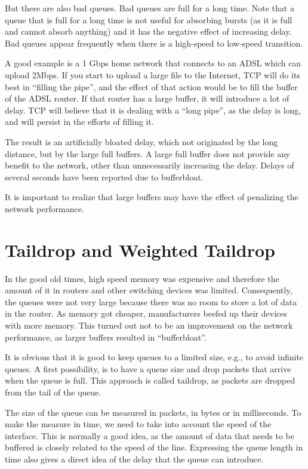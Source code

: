 But there are also bad queues.
Bad queues are full for a long time.
Note that a queue that is full for a long time is not useful for absorbing bursts (as it is full and cannot absorb anything) and it has the negative effect of increasing delay.
Bad queues appear frequently when there is a high-speed to low-speed transition.

A good example is a 1 Gbps home network that connects to an ADSL which can upload 2Mbps.
If you start to upload a large file to the Internet, TCP will do its best in ``filling the pipe'', and the effect of that action would be to fill the buffer of the ADSL router.
If that router has a large buffer, it will introduce a lot of delay.
TCP will believe that it is dealing with a ``long pipe'', as the delay is long, and will persist in the efforts of filling it.

The result is an artificially bloated delay, which not originated by the long distance, but by the large full buffers.
A large full buffer does not provide any benefit to the network, other than unnecessarily increasing the delay.
Delays of several seconds have been reported due to bufferbloat.

It is important to realize that large buffers may have the effect of penalizing the network performance.

\section{Taildrop and Weighted Taildrop}

In the good old times, high speed memory was expensive and therefore the amount of it in routers and other switching devices was limited.
Consequently, the queues were not very large because there was no room to store a lot of data in the router.
As memory got cheaper, manufacturers beefed up their devices with more memory.
This turned out not to be an improvement on the network performance, as larger buffers resulted in ``bufferbloat''.

It is obvious that it is good to keep queues to a limited size, e.g., to avoid infinite queues.
A first possibility, is to have a queue size and drop packets that arrive when the queue is full.
This approach is called taildrop, as packets are dropped from the tail of the queue.

The size of the queue can be measured in packets, in bytes or in milliseconds.
To make the measure in time, we need to take into account the speed of the interface.
This is normally a good idea, as the amount of data that needs to be buffered is closely related to the speed  of the line.
Expressing the queue length in time also gives a direct idea of the delay that the queue can introduce.

